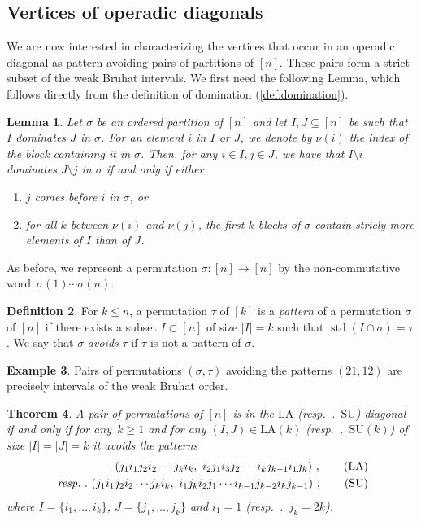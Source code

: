 \documentclass{amsart}
\newcommand{\darkblue}{\color{darkblue}} %
\newtheorem{theorem}{Theorem}[section]
\newtheorem{lemma}[theorem]{Lemma}
\theoremstyle{definition}
\newtheorem{definition}[theorem]{Definition}
\newtheorem{example}[theorem]{Example}
\DeclareMathOperator{\std}{std}
\newcommand{\resp}{\textit{resp.}~} %
\newcommand{\defn}[1]{\textsl{\darkblue #1}} %
\newcommand{\SU}{\mathrm{SU}}
\newcommand{\LA}{\mathrm{LA}}
\begin{document}

\subsection{Vertices of operadic diagonals}
\label{subsec:vertices-operadic-diags}

We are now interested in characterizing the vertices that occur in an operadic diagonal as pattern-avoiding pairs of partitions of $[n]$. 
These pairs form a strict subset of the weak Bruhat intervals. 
We first need the following Lemma, which follows directly from the definition of domination (\cref{def:domination}).

\begin{lemma}
\label{lem:Coherent Domination}
Let $\sigma$ be an ordered partition of $[n]$ and let $I,J \subseteq [n]$ be such that $I$ dominates $J$ in $\sigma$. 
For an element $i$ in $I$ or $J$, we denote by $\nu(i)$ the index of the block containing it in $\sigma$. 
Then, for any $i \in I,j \in J$, we have that $I\setminus i$ dominates $J\setminus j$ in $\sigma$ if and only if either
\begin{enumerate}
    \item $j$ comes before $i$ in $\sigma$, or 
    \item for all $k$ between $\nu(i)$ and $\nu(j)$, the first $k$ blocks of $\sigma$ contain stricly more elements of $I$ than of $J$.
\end{enumerate}
\end{lemma}

As before, we represent a permutation $\sigma: [n] \to [n]$ by the non-commutative word~$\sigma(1)\cdots \sigma(n)$.

\begin{definition}
For $k\leq n$, a permutation $\tau$ of $[k]$ is a \defn{pattern} of a permutation $\sigma$ of $[n]$ if there exists a subset $I \subset [n]$ of size $|I|=k$ such that $\std(I \cap \sigma)=\tau$. 
We say that $\sigma$ \defn{avoids} $\tau$ if $\tau$ is not a pattern of $\sigma$. 
\end{definition}

\begin{example}
Pairs of permutations $(\sigma,\tau)$ avoiding the patterns $(21,12)$ are precisely intervals of the weak Bruhat order. 
\end{example}

\begin{theorem}
\label{prop: LAD Fish Pattern}
A pair of permutations of $[n]$ is in the $\LA$ (\resp.~$\SU$) diagonal if and only if for any~$k\geq 1$ and for any $(I,J) \in \LA(k)$ (\resp.~$\SU(k)$) of size $|I|=|J|=k$ it avoids the patterns 
\begin{align}
    (j_1 i_1 j_2 i_2 \cdots j_k i_k,\ i_2 j_1 i_3 j_2 \cdots i_k j_{k-1} i_1 j_k) \ , \tag{LA} \label{eq:pattern} \\
    \text{ \resp.~} (j_1 i_1 j_2 i_2 \cdots j_k i_k, \ i_1 j_k i_2 j_1 \cdots i_{k-1} j_{k-2}i_k j_{k-1}) \ , \tag{SU}
\end{align}
where $I=\{i_1,\dots,i_k\}$, $J=\{j_1,\dots,j_k\}$ and $i_1=1$ (\resp.~$j_k=2k$).
\end{theorem}
\end{document}
